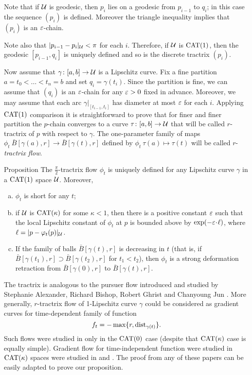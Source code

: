 \documentclass[oneside,a4paper, 12pt]{article}
\begin{document}
Note that if ${\mathcal{U}}$ is geodesic, then 
$p_i$ lies on a geodesic from $p_{i-1}$ to $q_i$; 
in this case the sequence $(p_i)$ is defined.
Moreover the triangle inequality implies that $(p_i)$ is an $\varepsilon$-chain.

Note also that $|p_{i-1}-p_i|_{\mathcal{U}}<\pi$ for each $i$.
Therefore, if ${\mathcal{U}}$ is $\mathrm{CAT}(1)$, then the geodesic $[p_{i-1},q_i]$ is uniquely defined and 
so is the discrete tractrix $(p_i)$.

Now assume that $\gamma\colon[a,b]\to \mathcal{U}$ is a Lipschitz curve.
Fix a fine partition $a=t_0<\dots<t_n=b$ and set $q_i=\gamma(t_i)$.
Since the partition is fine, we can assume that $(q_i)$ is an $\varepsilon$-chain for any $\varepsilon>0$ fixed in advance.
Moreover, we may assume that each arc $\gamma|_{[t_{i-1},t_i]}$ has diameter at most $\varepsilon$ for each $i$.
Applying $\mathrm{CAT}(1)$ comparison it is straightforward to prove that for finer and finer partition the $p$-chain converges to a curve $\tau\colon[a,b]\to \mathcal{U}$ that will be called $r$-tractrix of $p$ with respect to $\gamma$.
The one-parameter family of maps $\phi_t\:\bar B[\gamma(a),r]\to \bar B[\gamma(t),r]$ defined by $\phi_t\:\tau(a)\mapsto \tau(t)$ will be called $r$-\emph{tractrix flow}.

\begin{thm}{Proposition}\label{prop-def}
The $\tfrac\pi2$-tractrix flow $\phi_t$ is uniquely defined for any Lipschitz curve $\gamma$ in a  $\mathrm{CAT}(1)$ space ${\mathcal{U}}$.
Moreover,
\begin{enumerate}[(a)]
 \item $\phi_t$ is short for any $t$;
 \item if ${\mathcal{U}}$ is $\mathrm{CAT}(\kappa)$ for some $\kappa<1$, then there is a positive constant $\varepsilon$ such that the local Lipschitz constant of $\phi_t$ at $p$ is bounded above by $\exp(-\eps\cdot\ell)$, where $\ell=|p-\varphi_t(p)|_{\mathcal{U}}$.
 \item If the family of balls $\bar B[\gamma(t),r]$ is decreasing in $t$ (that is, if $\bar B[\gamma(t_1),r]\supset\bar B[\gamma(t_2),r]$ for $t_1<t_2$), then $\phi_t$ is a strong deformation retraction from $\bar B[\gamma(0),r]$ to $\bar B[\gamma(t),r]$.
\end{enumerate}
\end{thm}

The tractrix is analogous to the pursuer flow introduced and studied by Stephanie Alexander, Richard Bishop, Robert Ghrist and Chanyoung Jun \cite{ABG,jun-thesis,jun}.
More generally, $r$-tractrix flow of 1-Lipschitz curve $\gamma$ could be considered as gradient curves for time-dependent family of function 
\[f_t=- \max\{r,\mathop{\rm dist}\nolimits_{\gamma(t)}\}.\]
Such flows were studied in \cite{jun-thesis} only in the $\mathrm{CAT}(0)$ case (despite that $\mathrm{CAT}(\kappa)$ case is equally simple).
Gradient flow for time-independent function were studied in $\mathrm{CAT}(\kappa)$ spaces were studied in \cite{lytchak-open-map} and \cite{ohta-palfia}.
The proof from any of these papers can be easily adapted to prove our proposition. 

{\small\sloppy

\printbibliography[heading=bibintoc]

}
\end{document}
